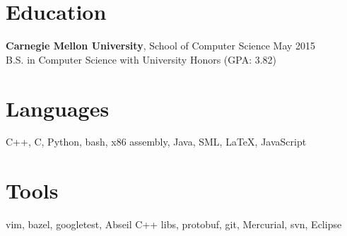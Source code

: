 \documentclass[margin]{res} \usepackage{hyperref}
\begin{document}
\begin{resume}
\section{Education}
  \textbf{Carnegie Mellon University}, School of Computer Science
    \hfill May 2015\\
  B.S. in Computer Science with University Honors (GPA: 3.82)

\section{Languages}
  C++, C, Python, bash, x86 assembly, Java, SML, \LaTeX, JavaScript

\section{Tools}
  vim, bazel, googletest, Abseil C++ libs, protobuf, git, Mercurial, svn, Eclipse

\end{resume}
\end{document}
